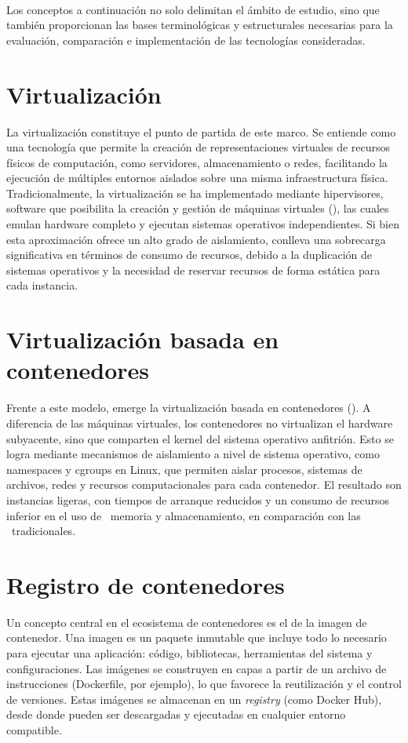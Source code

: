 \label{cap:marcoConceptual}
\mbox{}\\
Los conceptos a continuación no solo delimitan el ámbito de estudio, sino que también proporcionan las bases terminológicas y estructurales necesarias para la evaluación, comparación e implementación de las tecnologías consideradas. 

\section{Virtualización}
La virtualización constituye el punto de partida de este marco. Se entiende como una tecnología que permite la creación de representaciones virtuales de recursos físicos de computación, como servidores, almacenamiento o redes, facilitando la ejecución de múltiples entornos aislados sobre una misma infraestructura física. Tradicionalmente, la virtualización se ha implementado mediante hipervisores, software que posibilita la creación y gestión de máquinas virtuales (\VM), las cuales emulan hardware completo y ejecutan sistemas operativos independientes. Si bien esta aproximación ofrece un alto grado de aislamiento, conlleva una sobrecarga significativa en términos de consumo de recursos, debido a la duplicación de sistemas operativos y la necesidad de reservar recursos de forma estática para cada instancia. 

\section{Virtualización basada en contenedores}
Frente a este modelo, emerge la virtualización basada en contenedores (\VBC). A diferencia de las máquinas virtuales, los contenedores no virtualizan el hardware subyacente, sino que comparten el kernel del sistema operativo anfitrión. Esto se logra mediante mecanismos de aislamiento a nivel de sistema operativo, como namespaces y cgroups en Linux, que permiten aislar procesos, sistemas de archivos, redes y recursos computacionales para cada contenedor. El resultado son instancias ligeras, con tiempos de arranque reducidos y un consumo de recursos inferior en el uso de \CPU\, memoria y almacenamiento, en comparación con las \VM\ tradicionales. 

\section{Registro de contenedores}
Un concepto central en el ecosistema de contenedores es el de la imagen de contenedor. Una imagen es un paquete inmutable que incluye todo lo necesario para ejecutar una aplicación: código, bibliotecas, herramientas del sistema y configuraciones. Las imágenes se construyen en capas a partir de un archivo de instrucciones (Dockerfile, por ejemplo), lo que favorece la reutilización y el control de versiones. Estas imágenes se almacenan en un \textit{registry} (como Docker Hub), desde donde pueden ser descargadas y ejecutadas en cualquier entorno compatible. 

